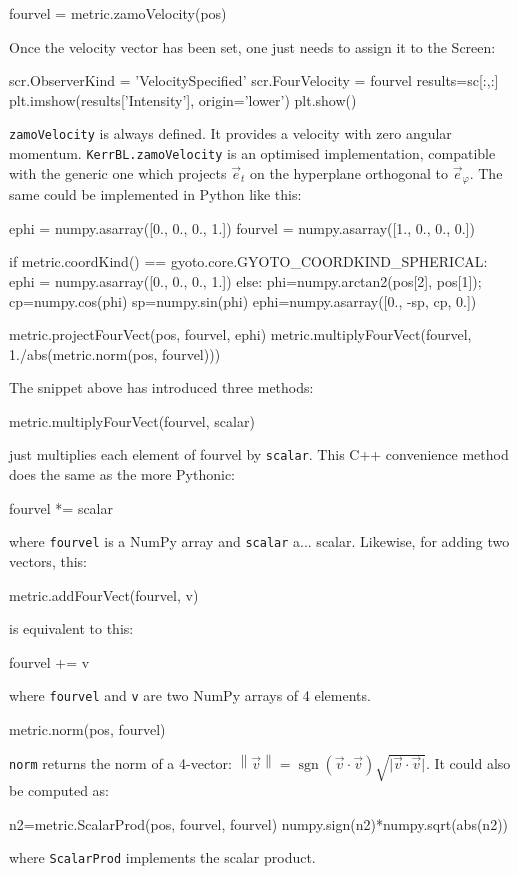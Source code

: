 \documentclass[a4paper,12pt]{article}
\DeclareMathOperator{\sgn}{sgn}
\begin{document}
\begin{code}
  fourvel = metric.zamoVelocity(pos)
\end{code}

Once the velocity vector has been set, one just needs to assign it to
the Screen:

\begin{code}
  scr.ObserverKind = 'VelocitySpecified'
  scr.FourVelocity = fourvel
  results=sc[:,:]
  plt.imshow(results['Intensity'], origin='lower')
  plt.show()
\end{code}

\texttt{zamoVelocity} is always defined. It provides a velocity with
zero angular momentum. \texttt{KerrBL.zamoVelocity} is an optimised
implementation, compatible with the generic one which projects $\vec
e_t$ on the hyperplane orthogonal to $\vec e_\varphi$. The same could
be implemented in Python like this:
\begin{code}
  ephi    = numpy.asarray([0., 0., 0., 1.])
  fourvel = numpy.asarray([1., 0., 0., 0.])

  if metric.coordKind() == gyoto.core.GYOTO_COORDKIND_SPHERICAL:
      ephi    = numpy.asarray([0., 0., 0., 1.])
  else:
      phi=numpy.arctan2(pos[2], pos[1]);
      cp=numpy.cos(phi)
      sp=numpy.sin(phi)
      ephi=numpy.asarray([0., -sp, cp, 0.])

  metric.projectFourVect(pos, fourvel, ephi)
  metric.multiplyFourVect(fourvel, 1./abs(metric.norm(pos, fourvel)))
\end{code}

The snippet above has introduced three methods:
\begin{code}
  metric.multiplyFourVect(fourvel, scalar) 
\end{code}
just multiplies each element of fourvel by \texttt{scalar}. This C++
convenience method does the same as the more Pythonic:
\begin{code}
  fourvel *= scalar
\end{code}
where \texttt{fourvel} is a NumPy array and \texttt{scalar}
a... scalar. Likewise, for adding two vectors, this:
\begin{code}
  metric.addFourVect(fourvel, v)
\end{code}
is equivalent to this:
\begin{code}
  fourvel += v
\end{code}
where \texttt{fourvel} and \texttt{v} are two NumPy arrays of 4 elements.

\begin{code}
  metric.norm(pos, fourvel)
\end{code}
\texttt{norm} returns the norm of a 4-vector:
$\left\lVert\vec{v}\right\rVert=\sgn(\vec{v}\cdot\vec{v})\sqrt{\lvert\vec{v}\cdot\vec{v}\rvert}$. It
could also be computed as:
\begin{code}
  n2=metric.ScalarProd(pos, fourvel, fourvel)
  numpy.sign(n2)*numpy.sqrt(abs(n2))
\end{code}
where \texttt{ScalarProd} implements the scalar product.
\end{document}
